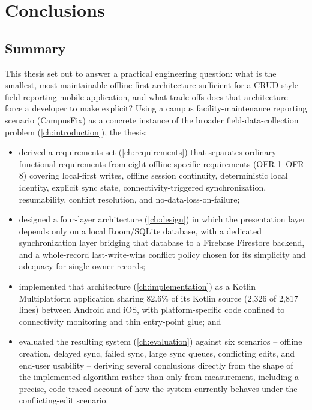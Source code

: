 \chapter{Conclusions}
\label{ch:conclusions}

\section{Summary}
\label{sec:summary}

This thesis set out to answer a practical engineering question: what is
the smallest, most maintainable offline-first architecture sufficient for
a CRUD-style field-reporting mobile application, and what trade-offs does
that architecture force a developer to make explicit? Using a campus
facility-maintenance reporting scenario (CampusFix) as a concrete
instance of the broader field-data-collection problem
(\cref{ch:introduction}), the thesis:

\begin{itemize}
  \item derived a requirements set (\cref{ch:requirements}) that
  separates ordinary functional requirements from eight offline-specific
  requirements (OFR-1--OFR-8) covering local-first writes, offline session
  continuity, deterministic local identity, explicit sync state,
  connectivity-triggered synchronization, resumability, conflict
  resolution, and no-data-loss-on-failure;
  \item designed a four-layer architecture (\cref{ch:design}) in which the
  presentation layer depends only on a local Room/SQLite database, with a
  dedicated synchronization layer bridging that database to a Firebase
  Firestore backend, and a whole-record last-write-wins conflict policy
  chosen for its simplicity and adequacy for single-owner records;
  \item implemented that architecture (\cref{ch:implementation}) as a
  Kotlin Multiplatform application sharing 82.6\% of its Kotlin source
  (2{,}326 of 2{,}817 lines) between Android and iOS, with
  platform-specific code confined to connectivity monitoring and thin
  entry-point glue; and
  \item evaluated the resulting system (\cref{ch:evaluation}) against six
  scenarios -- offline creation, delayed sync, failed sync, large sync
  queues, conflicting edits, and end-user usability -- deriving several
  conclusions directly from the shape of the implemented algorithm rather
  than only from measurement, including a precise, code-traced account of
  how the system currently behaves under the conflicting-edit scenario.
\end{itemize}

